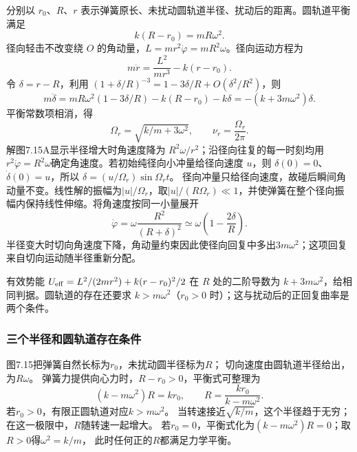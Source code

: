 \documentclass[UTF8,fontset=fandol,a4paper,11pt]{ctexart}
\newcommand{\figcaption}[1]{\par\vspace{2pt}{\small\color{muted}#1}\par}
\begin{document}
\begin{center}\begin{minipage}{\linewidth}\centering{}\figcaption{解图 7.15A}\end{minipage}\end{center}
分别以 $r_0$、$R$、$r$ 表示弹簧原长、未扰动圆轨道半径、扰动后的距离。圆轨道平衡满足
\[k(R-r_0)=mR\omega^2.\]
径向轻击不改变绕 $O$ 的角动量，$L=mr^2\dot\varphi=mR^2\omega$。径向运动方程为
\[m\ddot r=\frac{L^2}{mr^3}-k(r-r_0).\]
令 $\delta=r-R$，利用 $(1+\delta/R)^{-3}=1-3\delta/R+O(\delta^2/R^2)$，则
\[m\ddot\delta=mR\omega^2\left(1-3\delta/R\right)-k(R-r_0)-k\delta
=-(k+3m\omega^2)\delta.\]
平衡常数项相消，得
\[\boxed{\Omega_r=\sqrt{k/m+3\omega^2},\qquad
\nu_r=\frac{\Omega_r}{2\pi}.}\]
解图7.15A显示半径增大时角速度降为 $R^2\omega/r^2$；沿径向往复的每一时刻均用$r^2\dot\varphi=R^2\omega$确定角速度。若初始纯径向小冲量给径向速度 $u$，则 $\delta(0)=0$、$\dot\delta(0)=u$，所以 $\delta=(u/\Omega_r)\sin\Omega_rt$。
径向冲量只给径向速度，故碰后瞬间角动量不变。线性解的振幅为$|u|/\Omega_r$，取$|u|/(R\Omega_r)\ll1$，并使弹簧在整个径向振幅内保持线性伸缩。将角速度按同一小量展开
\[\dot\varphi=\omega\frac{R^2}{(R+\delta)^2}
\simeq\omega\left(1-\frac{2\delta}{R}\right).\]
半径变大时切向角速度下降，角动量约束因此使径向回复中多出$3m\omega^2$；这项回复来自切向运动随半径重新分配。

有效势能 $U_{
\rm eff}=L^2/(2mr^2)+k(r-r_0)^2/2$ 在 $R$ 处的二阶导数为 $k+3m\omega^2$，给相同判据。圆轨道的存在还要求 $k>m\omega^2$（$r_0>0$ 时）；这与扰动后的正回复曲率是两个条件。
\subsubsection*{三个半径和圆轨道存在条件}
图7.15把弹簧自然长标为$r_0$，未扰动圆半径标为$R$；
切向速度由圆轨道半径给出，为$R\omega$。
弹簧力提供向心力时，$R-r_0>0$，平衡式可整理为
\[
(k-m\omega^2)R=kr_0,\qquad
R=\frac{kr_0}{k-m\omega^2}.
\]
若$r_0>0$，有限正圆轨道对应$k>m\omega^2$。
当转速接近$\sqrt{k/m}$，这个半径趋于无穷；
在这一极限中，$R$随转速一起增大。
若$r_0=0$，平衡式化为$(k-m\omega^2)R=0$；取$R>0$得$\omega^2=k/m$，
此时任何正的$R$都满足力学平衡。
\end{document}
